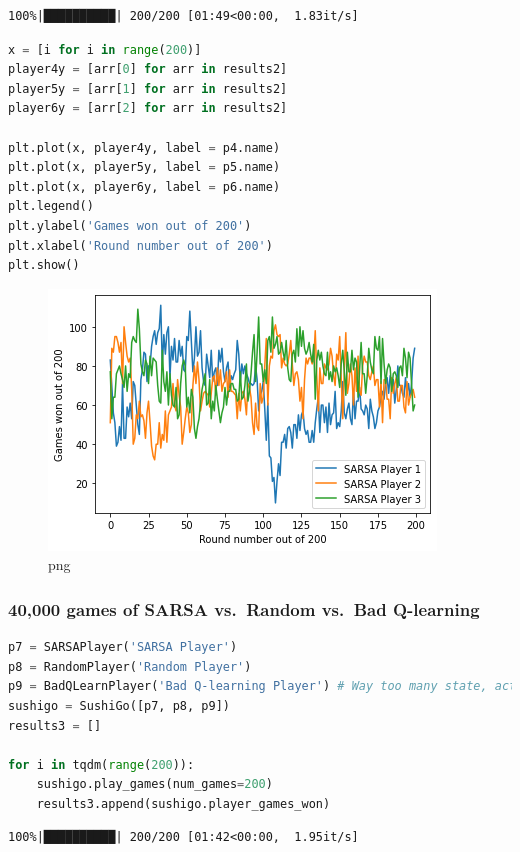\begin{lstlisting}
100%|██████████| 200/200 [01:49<00:00,  1.83it/s]
\end{lstlisting}

\begin{lstlisting}[language=Python]
x = [i for i in range(200)]
player4y = [arr[0] for arr in results2]
player5y = [arr[1] for arr in results2]
player6y = [arr[2] for arr in results2]

plt.plot(x, player4y, label = p4.name)
plt.plot(x, player5y, label = p5.name)
plt.plot(x, player6y, label = p6.name)
plt.legend()
plt.ylabel('Games won out of 200')
plt.xlabel('Round number out of 200')
plt.show()
\end{lstlisting}

\begin{figure}
\centering
\includegraphics{sushigo_files/sushigo_13_0.png}
\caption{png}
\end{figure}

\hypertarget{games-of-sarsa-vs.-random-vs.-bad-q-learning}{%
\subsubsection{40,000 games of SARSA vs.~Random vs.~Bad
Q-learning}\label{games-of-sarsa-vs.-random-vs.-bad-q-learning}}

\begin{lstlisting}[language=Python]
p7 = SARSAPlayer('SARSA Player')
p8 = RandomPlayer('Random Player')
p9 = BadQLearnPlayer('Bad Q-learning Player') # Way too many state, action combos
sushigo = SushiGo([p7, p8, p9])
results3 = []
  
for i in tqdm(range(200)):
    sushigo.play_games(num_games=200)
    results3.append(sushigo.player_games_won)
\end{lstlisting}

\begin{lstlisting}
100%|██████████| 200/200 [01:42<00:00,  1.95it/s]
\end{lstlisting}

